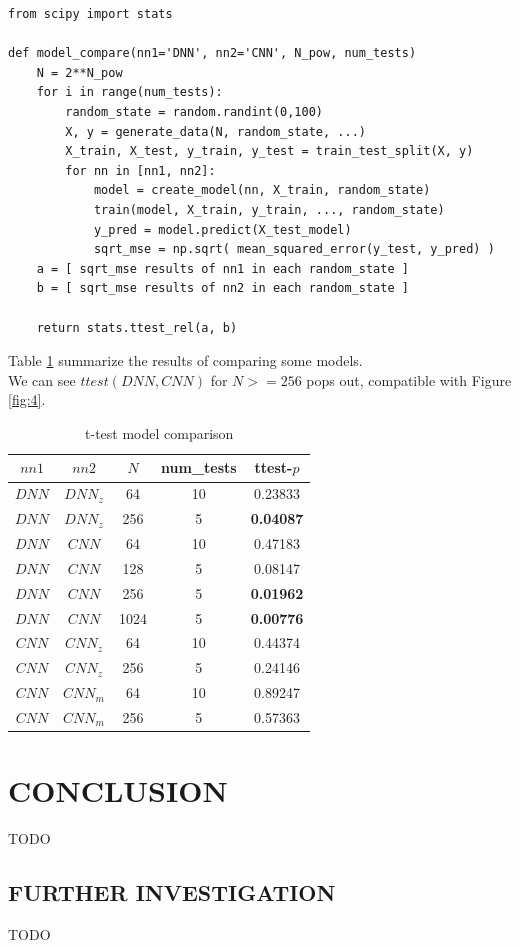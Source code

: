 \documentclass[a4paper, 12pt]{report}
\begin{document}
\begin{verbatim}
from scipy import stats

def model_compare(nn1='DNN', nn2='CNN', N_pow, num_tests)
    N = 2**N_pow
    for i in range(num_tests):
        random_state = random.randint(0,100)
        X, y = generate_data(N, random_state, ...)
        X_train, X_test, y_train, y_test = train_test_split(X, y)
        for nn in [nn1, nn2]:
            model = create_model(nn, X_train, random_state)
            train(model, X_train, y_train, ..., random_state)
            y_pred = model.predict(X_test_model)
            sqrt_mse = np.sqrt( mean_squared_error(y_test, y_pred) )
    a = [ sqrt_mse results of nn1 in each random_state ]
    b = [ sqrt_mse results of nn2 in each random_state ]

    return stats.ttest_rel(a, b)
\end{verbatim}

Table \ref{table:9} summarize the results of comparing some models.\\
We can see $ttest(DNN, CNN)$ for $N >= 256$ pops out, compatible with Figure \ref{fig:4}.

\begin{table}[h!]
    \scriptsize
    \centering
    \begin{tabular}{||c c c c c||} 
        \hline
        $nn1$ & $nn2$ & $N$ & num\_tests & ttest-$p$ \\ [0.5ex] 
        \hline\hline
        $DNN$ & $DNN_z$ & 64 & 10 & 0.23833 \\ 
        \hline
        $DNN$ & $DNN_z$ & 256 & 5 & \textbf{0.04087} \\ 
        \hline
        $DNN$ & $CNN$ & 64 & 10 & 0.47183 \\ 
        \hline
        $DNN$ & $CNN$ & 128 & 5 & 0.08147 \\ 
        \hline
        \rowcolor{yellow}
        $DNN$ & $CNN$ & 256 & 5 & \textbf{0.01962} \\ 
        \hline
        \rowcolor{yellow}
        $DNN$ & $CNN$ & 1024 & 5 & \textbf{0.00776} \\ 
        \hline
        $CNN$ & $CNN_z$ & 64 & 10 & 0.44374 \\ 
        \hline
        $CNN$ & $CNN_z$ & 256 & 5 & 0.24146 \\ 
        \hline
        $CNN$ & $CNN_m$ & 64 & 10 & 0.89247 \\ 
        \hline
        $CNN$ & $CNN_m$ & 256 & 5 & 0.57363 \\ 
        \hline
    \end{tabular}
    \caption{t-test model comparison}
    \label{table:9}
\end{table}

\chapter{CONCLUSION}
TODO

\section{FURTHER INVESTIGATION}
TODO

\printbibliography
\end{document}
